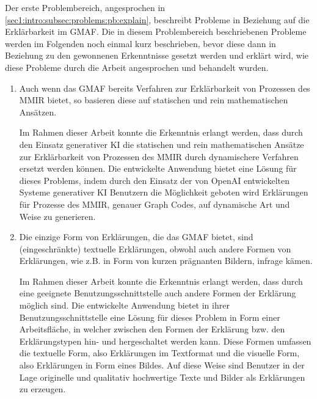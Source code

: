 Der erste Problembereich, angesprochen in \cref{sec1:intro:subsec:problems:pb:explain}, beschreibt Probleme in Beziehung auf die Erklärbarkeit im GMAF.
Die in diesem Problembereich beschriebenen Probleme werden im Folgenden noch einmal kurz beschrieben, bevor diese dann in Beziehung zu den gewonnenen Erkenntnisse gesetzt werden und erklärt wird, wie diese Probleme durch die Arbeit angesprochen und behandelt wurden.
\begin{enumerate}
  \item Auch wenn das GMAF bereits Verfahren zur Erklärbarkeit von Prozessen des MMIR bietet, so basieren diese auf statischen und rein mathematischen Ansätzen.

  Im Rahmen dieser Arbeit konnte die Erkenntnis erlangt werden, dass durch den Einsatz generativer KI die statischen und rein mathematischen Ansätze zur Erklärbarkeit von Prozessen des MMIR durch dynamischere Verfahren ersetzt werden können.
  Die entwickelte Anwendung bietet eine Lösung für dieses Problems, indem durch den Einsatz der von OpenAI entwickelten Systeme generativer KI Benutzern die Möglichkeit geboten wird Erklärungen für Prozesse des MMIR, genauer Graph Codes, auf dynamische Art und Weise zu generieren.

  \item Die einzige Form von Erklärungen, die das GMAF bietet, sind (eingeschränkte) textuelle Erklärungen, obwohl auch andere Formen von Erklärungen, wie z.B. in Form von kurzen prägnanten Bildern, infrage kämen.


  Im Rahmen dieser Arbeit konnte die Erkenntnis erlangt werden, dass durch eine geeignete Benutzungsschnittstelle auch andere Formen der Erklärung möglich sind.
  Die entwickelte Anwendung bietet in ihrer Benutzungsschnittstelle eine Lösung für dieses Problem in Form einer Arbeitsfläche, in welcher zwischen den Formen der Erklärung bzw. den Erklärungstypen hin- und hergeschaltet werden kann.
  Diese Formen umfassen die textuelle Form, also Erklärungen im Textformat und die visuelle Form, also Erklärungen in Form eines Bildes.
  Auf diese Weise sind Benutzer in der Lage originelle und qualitativ hochwertige Texte und Bilder als Erklärungen zu erzeugen.


\end{enumerate}
